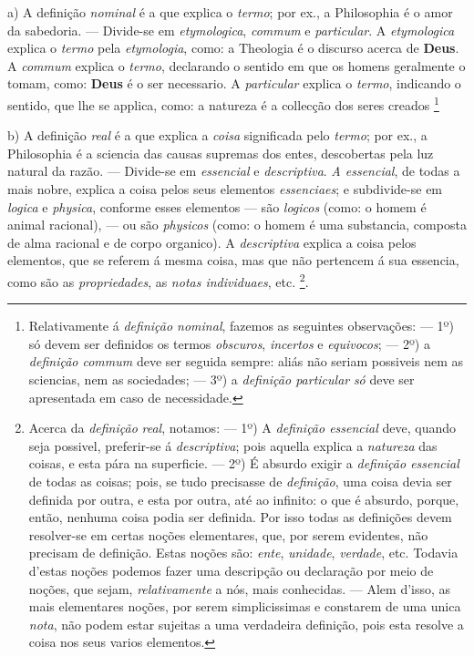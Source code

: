 a) A definição \emph{nominal} é a que explica o \emph{termo}; por ex., a Philosophia é o amor da sabedoria. --- Divide-se em \emph{etymologica}, \emph{commum} e \emph{particular}. A \emph{etymologica} explica o \emph{termo} pela \emph{etymologia}, como: a Theologia é o discurso acerca de \textbf{Deus}. A \emph{commum} explica o \emph{termo}, declarando o sentido em que os homens geralmente o tomam, como: \textbf{Deus} é o ser necessario. A \emph{particular} explica o \emph{termo}, indicando o sentido, que lhe se applica, como: a natureza é a collecção dos seres creados \footnote{Relativamente á \emph{definição nominal}, fazemos as seguintes observações: --- 1º) só devem ser definidos os termos \emph{obscuros}, \emph{incertos} e \emph{equivocos}; --- 2º) a \emph{definição commum} deve ser seguida sempre: aliás não seriam possiveis nem as sciencias, nem as sociedades; --- 3º) a \emph{definição particular} \emph{só} deve ser apresentada em caso de necessidade.}

b) A definição \emph{real} é a que explica a \emph{coisa} significada pelo \emph{termo}; por ex., a Philosophia é a sciencia das causas supremas dos entes, descobertas pela luz natural da razão. --- Divide-se em \emph{essencial} e \emph{descriptiva}. \emph{A essencial}, de todas a mais nobre, explica a coisa pelos seus elementos \emph{essenciaes}; e subdivide-se em \emph{logica} e \emph{physica}, conforme esses elementos --- são \emph{logicos} (como: o homem é animal racional), --- ou são \emph{physicos} (como: o homem é uma substancia, composta de alma racional e de corpo organico). A \emph{descriptiva} explica a coisa pelos elementos, que se referem á mesma coisa, mas que não pertencem á sua essencia, como são as \emph{propriedades}, as \emph{notas individuaes}, etc. \footnote{Acerca da \emph{definição} \emph{real}, notamos: --- 1º) A \emph{definição essencial} deve, quando seja possivel, preferir-se á \emph{descriptiva}; pois aquella explica a \emph{natu}\emph{reza} das coisas, e esta pára na superficie. --- 2º) É absurdo exigir a \emph{definição essencial} de todas as coisas; pois, se tudo precisasse de \emph{definição}, uma coisa devia ser definida por outra, e esta por outra, até ao infinito: o que é absurdo, porque, então, nenhuma coisa podia ser definida. Por isso todas as definições devem resolver-se em certas noções elementares, que, por serem evidentes, não precisam de definição. Estas noções são: \emph{ente}, \emph{unidade}, \emph{verdade}, etc. Todavia d'estas noções podemos fazer uma descripção ou declaração por meio de noções, que sejam, \emph{relativamente} a nós, mais conhecidas. --- Alem d'isso, as mais elementares noções, por serem simplicissimas e constarem de uma unica \emph{nota}, não podem estar sujeitas a uma verdadeira definição, pois esta resolve a coisa nos seus varios elementos.}.

